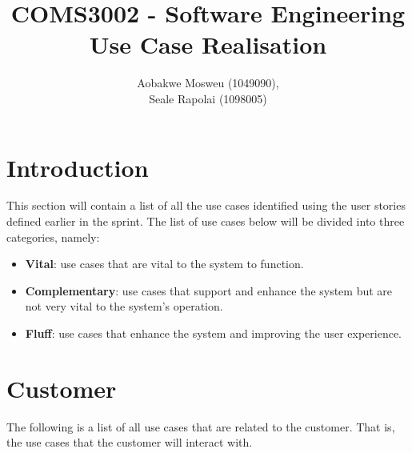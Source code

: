 \documentclass[11pt]{article}
\begin{document}
	\title{
		COMS3002 - Software Engineering\\
		\large Use Case Realisation
	}
	\author{Aobakwe Mosweu (1049090), \\Seale Rapolai (1098005)}
	\maketitle
	
	\clearpage
	\tableofcontents
	\clearpage
	
	\section{Introduction}
	\begin{flushleft}
		This section will contain a list of all the use cases identified using the user stories defined earlier in the sprint. The list of use cases below will be divided into three categories, namely:
	\end{flushleft}
	\begin{itemize}
		\item \textbf{Vital}: use cases that are vital to the system to function.
		\item \textbf{Complementary}: use cases that support and enhance the system but are not very vital to the system's operation.
		\item \textbf{Fluff}: use cases that enhance the system and improving the user experience.
	\end{itemize}
	
	\section{Customer}
	\begin{flushleft}
		The following is a list of all use cases that are related to the customer. That is, the use cases that the customer will interact with.
	\end{flushleft}
\end{document}
